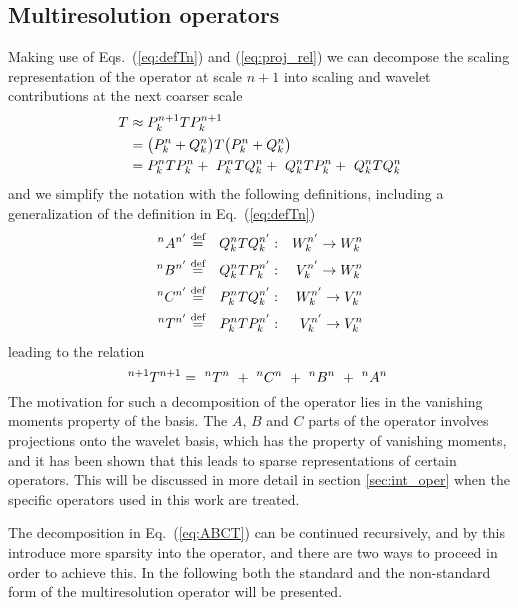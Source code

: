 \subsection{Multiresolution operators}
Making use of Eqs.~(\ref{eq:defTn}) and (\ref{eq:proj_rel}) we can decompose the 
scaling representation of the operator at scale $n+1$ into scaling and wavelet contributions
at the next coarser scale
\begin{align}
    T	&\approx    {P}_{k}^{n+1} T{P}_{k}^{n+1}\\
	&=	    \big({P}_{k}^{n} + {Q}_{k}^{n}\big) T 
		    \big({P}_{k}^{n} + {Q}_{k}^{n}\big)\\
	&=	    {P}_{k}^{n} T{P}_{k}^{n} +\ {P}_{k}^{n} T{Q}_{k}^{n} +\ {Q}_{k}^{n} T{P}_{k}^{n} +\ {Q}_{k}^{n} T{Q}_{k}^{n}
\end{align}
and we simplify the notation with the following definitions, including a generalization of the
definition in Eq.~(\ref{eq:defTn})
\begin{eqnarray}
    \label{eq:defABCT}
    \begin{split}
    	^{n}A^{n'} &\stackrel{\text{def}}{\hbox{=}}& {Q}_{k}^{n} T{Q}_{k}^{n'}&:& {W}_{k}^{n'}\rightarrow {W}_{k}^{n}\\
	^{n}B^{n'} &\stackrel{\text{def}}{\hbox{=}}& {Q}_{k}^{n} T{P}_{k}^{n'}&:& {V}_{k}^{n'}\rightarrow {W}_{k}^{n}\\
	^{n}C^{n'} &\stackrel{\text{def}}{\hbox{=}}& {P}_{k}^{n} T{Q}_{k}^{n'}&:& {W}_{k}^{n'}\rightarrow {V}_{k}^{n}\\
	^{n}T^{n'} &\stackrel{\text{def}}{\hbox{=}}& {P}_{k}^{n} T{P}_{k}^{n'}&:& {V}_{k}^{n'}\rightarrow {V}_{k}^{n}
    \end{split}
\end{eqnarray}
leading to the relation
\begin{equation}
    \label{eq:ABCT}
    \T{n+1}{n+1} =\ \T{n}{n}\ +\ \C{n}{n}\ +\ \B{n}{n}\ +\ \A{n}{n}\ 
\end{equation} 
The motivation for such a decomposition of the operator lies in the vanishing moments
property of the basis. The $A$, $B$ and $C$ parts of the operator involves projections
onto the wavelet basis, which has the property of vanishing moments, and it has been 
shown \cite{Beylkin} that this leads to sparse representations of certain operators.
This will be discussed in more detail in section \ref{sec:int_oper} when the specific 
operators used in this work are treated.

The decomposition in Eq.~(\ref{eq:ABCT}) can be continued recursively, and by this introduce
more sparsity into the operator, and there are two ways to proceed in order to achieve
this. In the following both the standard and the non-standard form of the multiresolution
operator will be presented.

